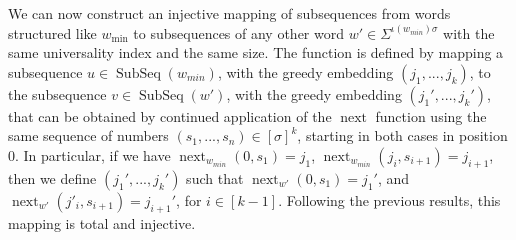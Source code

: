 \documentclass[runningheads,UKenglish,cleveref, autoref, thm-restate]{llncs}
\DeclareMathOperator\ScatFact{SubSeq}
\DeclareMathOperator{\nextAlphPos}{next}
\begin{document}
We can now construct an injective mapping of subsequences from words structured like $w_{\min}$ to subsequences of any other word $w'\in\Sigma^{\iota(w_{min})\sigma}$ with the same universality index and the same size. The function is defined by mapping a subsequence $u\in\ScatFact(w_{min})$, with the greedy embedding $(j_1,...,j_{k})$, to the subsequence $v\in\ScatFact(w')$, with the greedy embedding $(j_1',...,j_{k}')$, that can be obtained by continued application of the $\nextAlphPos$ function using the same sequence of numbers $(s_1,...,s_n)\in[\sigma]^k$, starting in both cases in position $0$. In particular, if we have $\nextAlphPos_{w_{min}}(0,s_1) = j_1$, $\nextAlphPos_{w_{min}}(j_i,s_{i+1}) = j_{i+1}$, then we define $(j_1',...,j_{k}')$ such that $\nextAlphPos_{w'}(0,s_1) = j_1'$, and $\nextAlphPos_{w'}(j'_i,s_{i+1}) = j_{i+1}'$, for $i\in[k-1]$. Following the previous results, this mapping is total and injective.


\end{document}
